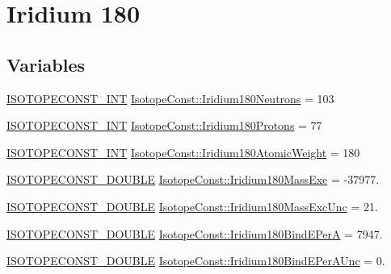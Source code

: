 \hypertarget{group___isotope_const-_iridium-_ir180}{}\section{Iridium 180}
\label{group___isotope_const-_iridium-_ir180}
\subsection*{Variables}
\begin{DoxyCompactItemize}
\item 
\mbox{\hyperlink{group___isotope_const-_macros_ga5f18360b3e99483a35c32d789e62621c}{I\+S\+O\+T\+O\+P\+E\+C\+O\+N\+S\+T\+\_\+\+I\+NT}} \mbox{\hyperlink{group___isotope_const-_iridium-_ir180_ga670c050193274350526068b340fb0653}{Isotope\+Const\+::\+Iridium180\+Neutrons}} = 103
\item 
\mbox{\hyperlink{group___isotope_const-_macros_ga5f18360b3e99483a35c32d789e62621c}{I\+S\+O\+T\+O\+P\+E\+C\+O\+N\+S\+T\+\_\+\+I\+NT}} \mbox{\hyperlink{group___isotope_const-_iridium-_ir180_ga52ac5f527bbc9c90433602c8fb22c072}{Isotope\+Const\+::\+Iridium180\+Protons}} = 77
\item 
\mbox{\hyperlink{group___isotope_const-_macros_ga5f18360b3e99483a35c32d789e62621c}{I\+S\+O\+T\+O\+P\+E\+C\+O\+N\+S\+T\+\_\+\+I\+NT}} \mbox{\hyperlink{group___isotope_const-_iridium-_ir180_gac11745b844fd262f9eeb8c68da055c59}{Isotope\+Const\+::\+Iridium180\+Atomic\+Weight}} = 180
\item 
\mbox{\hyperlink{group___isotope_const-_macros_ga8f45a7272ce02c0b4c65c44636ed719a}{I\+S\+O\+T\+O\+P\+E\+C\+O\+N\+S\+T\+\_\+\+D\+O\+U\+B\+LE}} \mbox{\hyperlink{group___isotope_const-_iridium-_ir180_ga2b34acb765f5fc04ced3cbcc1fa2006c}{Isotope\+Const\+::\+Iridium180\+Mass\+Exc}} = -\/37977.
\item 
\mbox{\hyperlink{group___isotope_const-_macros_ga8f45a7272ce02c0b4c65c44636ed719a}{I\+S\+O\+T\+O\+P\+E\+C\+O\+N\+S\+T\+\_\+\+D\+O\+U\+B\+LE}} \mbox{\hyperlink{group___isotope_const-_iridium-_ir180_ga433131cd6d710c049daf7c14536617db}{Isotope\+Const\+::\+Iridium180\+Mass\+Exc\+Unc}} = 21.
\item 
\mbox{\hyperlink{group___isotope_const-_macros_ga8f45a7272ce02c0b4c65c44636ed719a}{I\+S\+O\+T\+O\+P\+E\+C\+O\+N\+S\+T\+\_\+\+D\+O\+U\+B\+LE}} \mbox{\hyperlink{group___isotope_const-_iridium-_ir180_ga04f607595085bdb71da0f6f5829b9472}{Isotope\+Const\+::\+Iridium180\+Bind\+E\+PerA}} = 7947.
\item 
\mbox{\hyperlink{group___isotope_const-_macros_ga8f45a7272ce02c0b4c65c44636ed719a}{I\+S\+O\+T\+O\+P\+E\+C\+O\+N\+S\+T\+\_\+\+D\+O\+U\+B\+LE}} \mbox{\hyperlink{group___isotope_const-_iridium-_ir180_gaa332dd8ec3a0de77507fbfd1b1cc463e}{Isotope\+Const\+::\+Iridium180\+Bind\+E\+Per\+A\+Unc}} = 0.

\end{DoxyCompactItemize}
